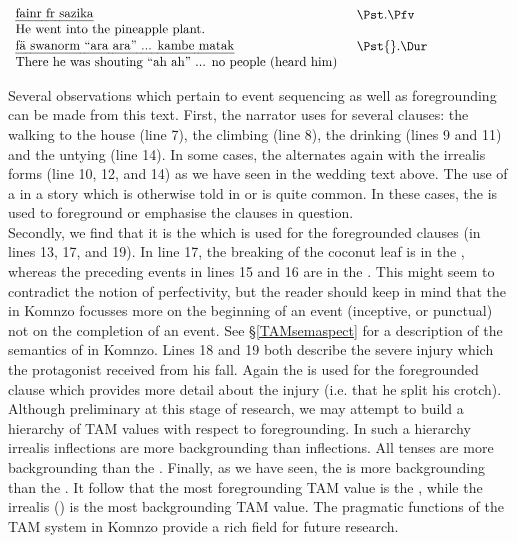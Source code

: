 \begin{exe}
	    $\begin{array}{l}
	   	\parbox{9cm}{\emph{fainr fr sazika}} \parbox{0,3cm}{\hfill}\parbox{4cm}{\Pst.\Pfv}\\
	    \parbox{9cm}{He went into the pineapple plant.} \parbox{0,3cm}{\hfill}\parbox{4cm}{\hfill}\\
	    \end{array}$
	    $\begin{array}{l}
	   	\parbox{9cm}{\emph{fä swanorm ``ara ara'' ... kambe matak}} \parbox{0,3cm}{\hfill}\parbox{4cm}{\Pst{}.\Dur}\\
	    \parbox{9cm}{There he was shouting ``ah ah'' ... no people (heard him)} \parbox{0,3cm}{\hfill}\parbox{4cm}{\hfill}\\
	    \end{array}$
	\\
	\label{masentext}
\end{exe}

Several observations which pertain to event sequencing as well as foregrounding can be made from this text. First, the narrator uses   for several clauses: the walking to the house (line 7), the climbing (line 8), the drinking (lines 9 and 11) and the untying (line 14). In some cases, the  alternates again with the irrealis  forms (line 10, 12, and 14) as we have seen in the wedding text above. The use of a   in a story which is otherwise told in  or  is quite common. In these cases, the  is used to foreground or emphasise the clauses in question.\\

Secondly, we find that it is the   which is used for the foregrounded clauses (in lines 13, 17, and 19). In line 17, the breaking of the coconut leaf is in the , whereas the preceding events in lines 15 and 16 are in the . This might seem to contradict the notion of perfectivity, but the reader should keep in mind that the  in Komnzo focusses more on the beginning of an event (inceptive, or punctual) not on the completion of an event. See \S{}\ref{TAMsemaspect} for a description of the semantics of  in Komnzo. Lines 18 and 19 both describe the severe injury which the protagonist received from his fall. Again the   is used for the foregrounded clause which provides more detail about the injury (i.e. that he split his crotch).\\

Although preliminary at this stage of research, we may attempt to build a hierarchy of TAM values with respect to foregrounding. In such a hierarchy irrealis inflections are more backgrounding than  inflections. All  tenses are more backgrounding than the . Finally, as we have seen, the  is more backgrounding than the . It follow that the most foregrounding TAM value is the , while the irrealis () is the most backgrounding TAM value. The pragmatic functions of the TAM system in Komnzo provide a rich field for future research.